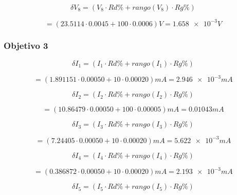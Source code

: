 \documentclass[DIV=calc, paper=a4, fontsize=11pt]{scrartcl}
\begin{document}
\begin{multicols}{2}
\begin{equation*}
    \delta V_8 = (V_8 \cdot Rd\% + rango(V_8) \cdot Rg\%) 
\end{equation*}

\begin{equation*}
    = (23.5114 \cdot 0.0045 + 100 \cdot 0.0006 ) V = \num{1.658e-3} V
\end{equation*}

\subsubsection*{Objetivo 3}

\begin{equation*}
    \delta I_1 = (I_1 \cdot Rd\% + rango(I_1) \cdot Rg\%) 
\end{equation*}

\begin{equation*}
    = (1.891151 \cdot 0.00050 + 10 \cdot 0.00020 ) mA = \num{2.946e-3} mA
\end{equation*}

\begin{equation*}
    \delta I_2 = (I_2 \cdot Rd\% + rango(I_2) \cdot Rg\%) 
\end{equation*}

\begin{equation*}
    = (10.86479 \cdot 0.00050 + 100 \cdot 0.00005 ) mA = \num{0.01043} mA
\end{equation*}

\begin{equation*}
    \delta I_3 = (I_3 \cdot Rd\% + rango(I_3) \cdot Rg\%) 
\end{equation*}

\begin{equation*}
    = (7.24405 \cdot 0.00050 + 10 \cdot 0.00020 ) mA = \num{5.622 e-3} mA
\end{equation*}

\begin{equation*}
    \delta I_4 = (I_4 \cdot Rd\% + rango(I_4) \cdot Rg\%) 
\end{equation*}

\begin{equation*}
    = (0.386872 \cdot 0.00050 + 10 \cdot 0.00020 ) mA = \num{2.193 e-3} mA
\end{equation*}

\begin{equation*}
    \delta I_5 = (I_5 \cdot Rd\% + rango(I_5) \cdot Rg\%) 
\end{equation*}


\end{multicols}
\end{document}
